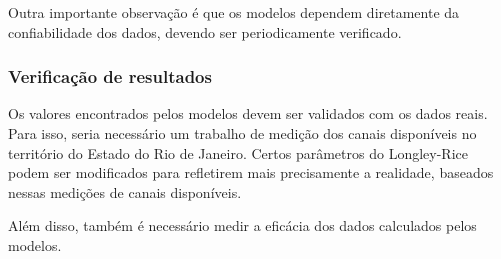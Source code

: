 Outra importante observação é que os modelos dependem diretamente da confiabilidade dos dados, devendo ser periodicamente verificado.

\subsubsection{Verificação de resultados}

Os valores encontrados pelos modelos devem ser validados com os dados reais. Para isso, seria necessário um trabalho de medição dos canais disponíveis no território do Estado do Rio de Janeiro. Certos parâmetros do Longley-Rice podem ser modificados para refletirem mais precisamente a realidade, baseados nessas medições de canais disponíveis.

Além disso, também é necessário medir a eficácia dos dados calculados pelos modelos.












